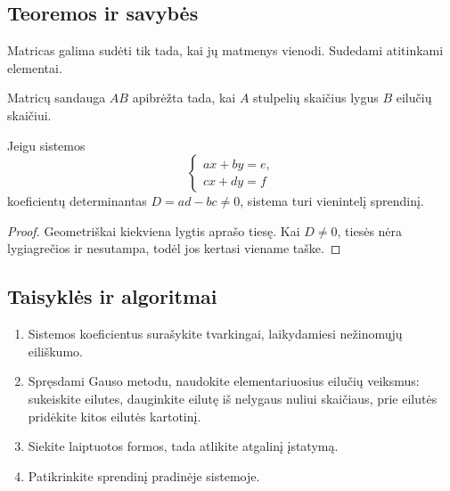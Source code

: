 \subsection{Teoremos ir savybės}
\begin{savybe}
Matricas galima sudėti tik tada, kai jų matmenys vienodi. Sudedami atitinkami elementai.
\end{savybe}
\begin{savybe}
Matricų sandauga \(AB\) apibrėžta tada, kai \(A\) stulpelių skaičius lygus \(B\) eilučių skaičiui.
\end{savybe}
\begin{teorema}
Jeigu sistemos
\[
\begin{cases}
ax+by=e,\\
cx+dy=f
\end{cases}
\]
koeficientų determinantas \(D=ad-bc\ne0\), sistema turi vienintelį sprendinį.
\end{teorema}
\begin{proof}
Geometriškai kiekviena lygtis aprašo tiesę. Kai \(D\ne0\), tiesės nėra lygiagrečios ir nesutampa, todėl jos kertasi viename taške.
\end{proof}

\subsection{Taisyklės ir algoritmai}
\begin{enumerate}[label=\arabic*.]
\item Sistemos koeficientus surašykite tvarkingai, laikydamiesi nežinomųjų eiliškumo.
\item Spręsdami Gauso metodu, naudokite elementariuosius eilučių veiksmus: sukeiskite eilutes, dauginkite eilutę iš nelygaus nuliui skaičiaus, prie eilutės pridėkite kitos eilutės kartotinį.
\item Siekite laiptuotos formos, tada atlikite atgalinį įstatymą.
\item Patikrinkite sprendinį pradinėje sistemoje.
\end{enumerate}

